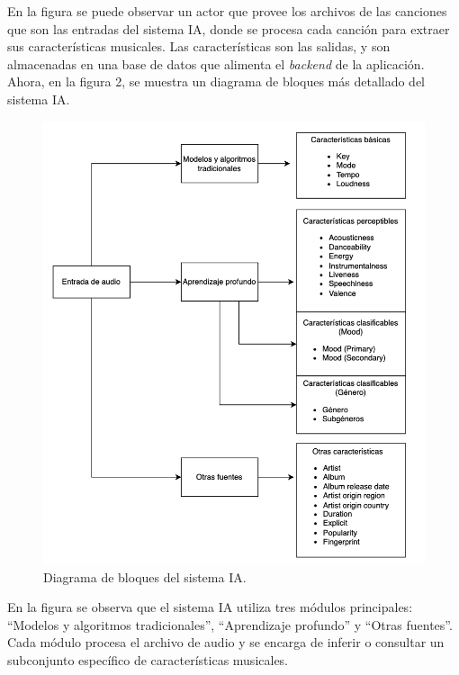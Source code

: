 \documentclass[
11pt, %
]{charter}
\begin{document}
\vspace{25px}
En la figura se puede observar un actor que provee los archivos de las canciones que son las entradas del sistema IA, donde se procesa cada canción para extraer sus características musicales. Las características son las salidas, y son almacenadas en una base de datos que alimenta el \textit{backend} de la aplicación. Ahora, en la figura 2, se muestra un diagrama de bloques más detallado del sistema IA. 

\begin{figure}[htpb]
\centering 
\includegraphics[width=.65\textwidth]{./Figuras/diagBloques2.png}
\caption{Diagrama de bloques del sistema IA.}
\label{fig:diagBloques}
\end{figure}

\vspace{25px}
En la figura se observa que el sistema IA utiliza tres módulos principales: ``Modelos y algoritmos tradicionales'', ``Aprendizaje profundo'' y ``Otras fuentes''. Cada módulo procesa el archivo de audio y se encarga de inferir o consultar un subconjunto específico de características musicales.


\end{document}
